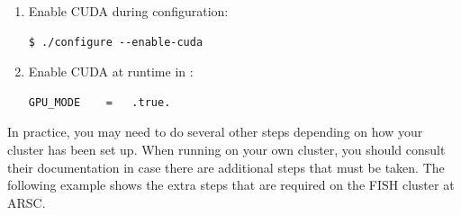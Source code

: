 \documentclass[10pt,fleqn,letterpaper]{article}
\begin{document}
\begin{enumerate}
\item Enable CUDA during configuration:
\begin{lstlisting}
$ ./configure --enable-cuda
\end{lstlisting}

\item Enable CUDA at runtime in :
\begin{lstlisting}
GPU_MODE    =   .true.
\end{lstlisting}
\end{enumerate}

In practice, you may need to do several other steps depending on how your
cluster has been set up. When running on your own cluster, you should consult
their documentation in case there are additional steps that must be taken. The
following example shows the extra steps that are required on the FISH cluster
at ARSC.
\end{document}

